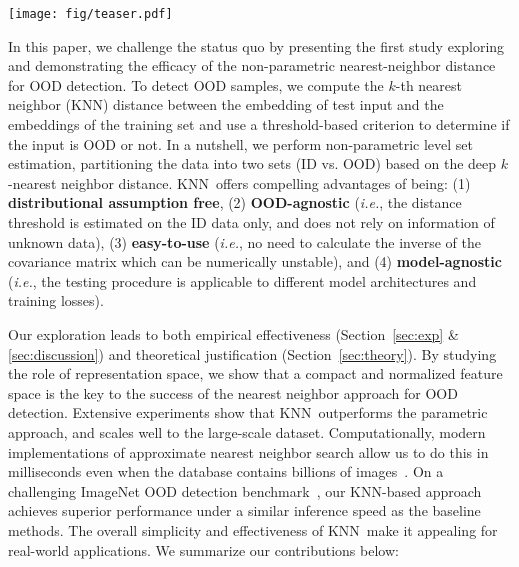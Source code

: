 \documentclass[nohyperref]{article}
\newcommand{\method}{{KNN}}
\theoremstyle{plain}
\theoremstyle{definition}
\theoremstyle{remark}
\begin{document}
\begin{figure*}[t]
\centering
\texttt{[image: fig/teaser.pdf]}
\caption{\small Illustration of our framework using nearest neighbors for OOD detection. \method performs non-parametric level set estimation, partitioning the data into two sets (ID vs. OOD) based on the $k$-th nearest neighbor distance. The distances are estimated from the penultimate feature embeddings, visualized via UMAP~\cite{mcinnes2018umap-software}.
Models are trained on ResNet-18~\cite{he2016identity} using cross-entropy loss (left) v.s. contrastive loss (right). The in-distribution data is CIFAR-10 (colored in non-gray colors) and  OOD data is LSUN (colored in gray). The shaded grey area in the density distribution plot indicates OOD samples that are misidentified as ID data. }
\label{fig:umap}
\end{figure*}


In this paper, {we challenge the status quo by presenting the first study exploring and demonstrating the efficacy of the non-parametric nearest-neighbor distance for OOD detection}. To detect OOD samples, we compute the  $k$-th nearest neighbor (KNN) distance between the embedding of test input and the embeddings of the training set and use
a threshold-based criterion to determine if the input
is OOD or not. In a nutshell, we perform non-parametric level set estimation, partitioning the data into two sets (ID vs. OOD) based on the deep $k$-nearest neighbor distance.  \method~offers compelling advantages of being: (1) \textbf{distributional assumption free}, (2) \textbf{OOD-agnostic} (\emph{i.e.}, the distance threshold is estimated on the ID data only, and does not rely on information of unknown data),  (3) \textbf{easy-to-use} (\emph{i.e.}, no need to calculate the inverse of the covariance matrix which can be numerically unstable), and (4) \textbf{model-agnostic} (\emph{i.e.}, the testing procedure is applicable to different model architectures and training losses).

Our exploration leads to both empirical effectiveness (Section~\ref{sec:exp} \& \ref{sec:discussion}) and theoretical justification (Section~\ref{sec:theory}). By studying the role of representation space, we show that a compact and normalized feature space is the key to the success of the nearest neighbor approach for OOD detection.  Extensive experiments show that \method~outperforms the parametric approach, and scales well to the large-scale dataset. Computationally, modern implementations of approximate nearest neighbor
search allow us to do this in milliseconds even when the database contains billions of images~\citep{faiss}. On a challenging ImageNet OOD detection benchmark~\cite{huang2021mos}, our KNN-based approach achieves superior performance under a similar inference speed as the baseline methods. The overall simplicity and effectiveness of \method~make it appealing for real-world applications. 
We summarize our contributions below:  
\end{document}

